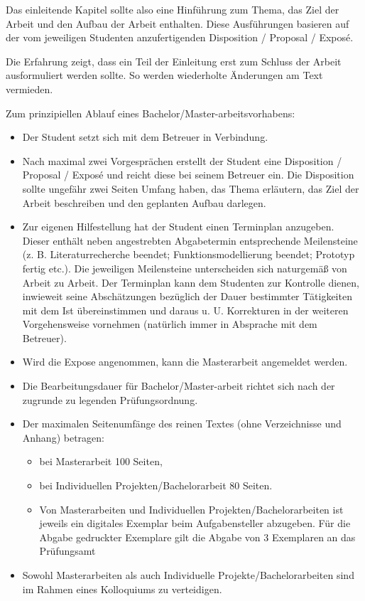 \documentclass[11pt]{scrartcl}
\begin{document}
Das einleitende Kapitel sollte also eine Hinführung zum Thema, das Ziel der Arbeit und den Aufbau der Arbeit enthalten. Diese Ausführungen basieren auf der vom jeweiligen Studenten anzufertigenden Disposition / Proposal / Exposé.

Die Erfahrung zeigt, dass ein Teil der Einleitung erst zum Schluss der Arbeit ausformuliert  werden sollte. So werden wiederholte Änderungen am Text vermieden.

Zum prinzipiellen Ablauf eines Bachelor/Master-arbeitsvorhabens:

\begin{itemize}
  \item Der Student setzt sich mit dem Betreuer in Verbindung.
  \item Nach maximal zwei Vorgesprächen erstellt der Student eine Disposition / Proposal / Exposé und reicht diese bei seinem Betreuer ein. Die Disposition sollte ungefähr zwei Seiten Umfang haben, das Thema erläutern, das Ziel der Arbeit beschreiben und den geplanten Aufbau darlegen.
  \item Zur eigenen Hilfestellung hat der Student einen Terminplan anzugeben. Dieser enthält neben angestrebten Abgabetermin entsprechende Meilensteine (z. B. Literaturrecherche beendet; Funktionsmodellierung beendet; Prototyp fertig etc.). Die jeweiligen Meilensteine unterscheiden sich naturgemäß von Arbeit zu Arbeit. Der Terminplan kann dem Studenten zur Kontrolle dienen, inwieweit seine Abschätzungen bezüglich der Dauer bestimmter Tätigkeiten mit dem Ist übereinstimmen und daraus u. U. Korrekturen in der weiteren Vorgehensweise vornehmen (natürlich immer in Absprache mit dem Betreuer).
  \item Wird die Expose angenommen, kann die Masterarbeit angemeldet werden.
  \item Die Bearbeitungsdauer für Bachelor/Master-arbeit  richtet sich nach der zugrunde zu legenden Prüfungsordnung.
  \item Der maximalen Seitenumfänge des reinen Textes (ohne Verzeichnisse und Anhang) betragen:
  \begin{itemize}
    \item bei Masterarbeit 100 Seiten,
    \item bei Individuellen Projekten/Bachelorarbeit 80 Seiten.
    \item Von Masterarbeiten und Individuellen Projekten/Bachelorarbeiten ist jeweils ein digitales Exemplar beim Aufgabensteller abzugeben. Für die Abgabe gedruckter Exemplare gilt die Abgabe von 3 Exemplaren an das Prüfungsamt
  \end{itemize}
  \item Sowohl Masterarbeiten als auch Individuelle Projekte/Bachelorarbeiten sind im Rahmen eines Kolloquiums zu verteidigen.
\end{itemize}
  
\end{document}

